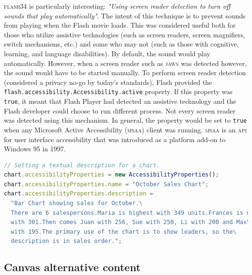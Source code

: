 \documentclass[sigconf]{acmart}
\begin{document}
\textsc{flash}34 is particularly interesting: \textit{"Using screen reader detection to turn off sounds that play automatically"}. The intent of this technique is to prevent sounds from playing when the Flash movie loads. This was considered useful both for those who utilize assistive technologies (such as screen readers, screen magnifiers, switch mechanisms, etc.) and some who may not (such as those with cognitive, learning, and language disabilities). By default, the sound would play automatically. However, when a screen reader such as \textsc{jaws} was detected however, the sound would have to be started manually. To perform screen reader detection (considered a privacy no-go by today's standards), Flash provided the \texttt{flash.accessibility.Accessibility.active} property. If this property was \texttt{true}, it meant that Flash Player had detected an assistive technology and the Flash developer could choose to run different process. Not every screen reader was detected using this mechanism. In general, the property would be set to \texttt{true} when any Microsoft Active Accessibility (\textsc{msaa}) client was running. \textsc{msaa} is an \textsc{api} for user interface accessibility that was introduced as a platform add-on to Windows 95 in 1997.

\begin{lstlisting}[language=JavaScript, style=ES6, label={lst:flash}, caption={Setting the description property for a non-text object in Flash (\textsc{flash}2)}]
// Setting a textual description for a chart.
chart.accessibilityProperties = new AccessibilityProperties();
chart.accessibilityProperties.name = "October Sales Chart";
chart.accessibilityProperties.description =
  "Bar Chart showing sales for October.\
  There are 6 salespersons.Maria is highest with 349 units.Frances is next\
  with 301.Then comes Juan with 256, Sue with 250, Li with 200 and Max\
  with 195.The primary use of the chart is to show leaders, so the\
  description is in sales order.";
\end{lstlisting}

\subsection{Canvas alternative content}
\end{document}
